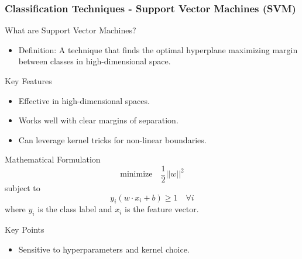 \documentclass[aspectratio=169]{beamer}
\begin{document}
\begin{frame}[fragile]
    \frametitle{Classification Techniques - Support Vector Machines (SVM)}
    \begin{block}{What are Support Vector Machines?}
        \begin{itemize}
            \item Definition: A technique that finds the optimal hyperplane maximizing margin between classes in high-dimensional space.
        \end{itemize}
    \end{block}

    \begin{block}{Key Features}
        \begin{itemize}
            \item Effective in high-dimensional spaces.
            \item Works well with clear margins of separation.
            \item Can leverage kernel tricks for non-linear boundaries.
        \end{itemize}
    \end{block}

    \begin{block}{Mathematical Formulation}
        \begin{equation}
            \text{minimize} \quad \frac{1}{2} ||w||^2
        \end{equation}
        subject to 
        \begin{equation}
            y_i(w \cdot x_i + b) \geq 1 \quad \forall i
        \end{equation}
        where \( y_i \) is the class label and \( x_i \) is the feature vector.
    \end{block}

    \begin{block}{Key Points}
        \begin{itemize}
            \item Sensitive to hyperparameters and kernel choice.
        \end{itemize}
    \end{block}
\end{frame}
\end{document}
